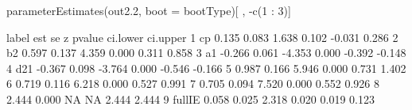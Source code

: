 \begin{Schunk}
\begin{Sinput}
 parameterEstimates(out2.2, boot = bootType)[ , -c(1 : 3)]
\end{Sinput}
\begin{Soutput}
   label    est    se      z pvalue ci.lower ci.upper
1     cp  0.135 0.083  1.638  0.102   -0.031    0.286
2     b2  0.597 0.137  4.359  0.000    0.311    0.858
3     a1 -0.266 0.061 -4.353  0.000   -0.392   -0.148
4    d21 -0.367 0.098 -3.764  0.000   -0.546   -0.166
5         0.987 0.166  5.946  0.000    0.731    1.402
6         0.719 0.116  6.218  0.000    0.527    0.991
7         0.705 0.094  7.520  0.000    0.552    0.926
8         2.444 0.000     NA     NA    2.444    2.444
9 fullIE  0.058 0.025  2.318  0.020    0.019    0.123
\end{Soutput}
\end{Schunk}
